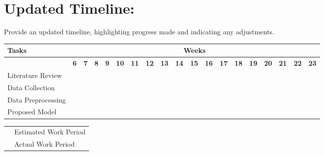 \documentclass[11pt,a4paper]{article}
\begin{document}
\newpage

\section{Updated Timeline:}
Provide an updated timeline, highlighting progress made and indicating any adjustments.

\begin{table}[h!]
\centering
\scriptsize
\renewcommand{\arraystretch}{1.2}
\begin{tabularx}{\textwidth}{|X|*{18}{c|}}
\hline
\textbf{Tasks} & \multicolumn{18}{c|}{\textbf{Weeks}} \\ \hline
& \textbf{6} & \textbf{7} & \textbf{8} & \textbf{9} & \textbf{10} & \textbf{11} & \textbf{12} & \textbf{13} & \textbf{14} & \textbf{15} & \textbf{16} & \textbf{17} & \textbf{18} & \textbf{19} & \textbf{20} & \textbf{21} & \textbf{22} & \textbf{23} \\ \hline
\multirow{2}{*}{Literature Review} & \cellcolor{estcolor} & \cellcolor{estcolor} & \cellcolor{estcolor} & \cellcolor{estcolor} & \cellcolor{estcolor} & & & & & & & & & & & & & \\ \cline{2-19}
& \cellcolor{actcolor} & \cellcolor{actcolor} & \cellcolor{actcolor} & \cellcolor{actcolor} & & & & & & & & & & & & & & \\ \hline
\multirow{2}{*}{Data Collection} & & & & & & \cellcolor{estcolor} & \cellcolor{estcolor} & \cellcolor{estcolor} & \cellcolor{estcolor} & \cellcolor{estcolor} & & & & & & & & \\ \cline{2-19}
& & & & & & \cellcolor{actcolor} & \cellcolor{actcolor} & \cellcolor{actcolor} & \cellcolor{actcolor} & & & & & & & & & \\ \hline
\multirow{2}{*}{Data Preprocessing} & & & & & & & & & & & \cellcolor{estcolor} & \cellcolor{estcolor} & \cellcolor{estcolor} & \cellcolor{estcolor} & & & & \\ \cline{2-19}
& & & & & & & & & & & \cellcolor{actcolor} & \cellcolor{actcolor} & \cellcolor{actcolor} & \cellcolor{actcolor} & \cellcolor{actcolor} & & & \\ \hline
\multirow{2}{*}{Proposed Model} & & & & & & & & & & & & & & & \cellcolor{estcolor} & \cellcolor{estcolor} & \cellcolor{estcolor} & \cellcolor{estcolor} \\ \cline{2-19}
& & & & & & & & & & & & & & & \cellcolor{actcolor} & \cellcolor{actcolor} & \cellcolor{actcolor} & \\ \hline
\end{tabularx}

\vspace{0.2cm}
\noindent
\begin{tabular}{ll}
\colorbox{estcolor}{\hspace{0.4cm}} & Estimated Work Period \\
\colorbox{actcolor}{\hspace{0.4cm}} & Actual Work Period \\
\end{tabular}
\end{table}
\end{document}
